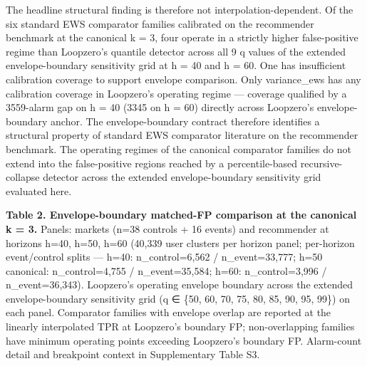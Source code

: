 \documentclass[
  11pt,
]{article}
\begin{document}
The headline structural finding is therefore not
interpolation-dependent. Of the six standard EWS comparator families
calibrated on the recommender benchmark at the canonical k = 3, four
operate in a strictly higher false-positive regime than Loopzero's
quantile detector across all 9 q values of the extended
envelope-boundary sensitivity grid at h = 40 and h = 60. One has
insufficient calibration coverage to support envelope comparison. Only
variance\_ews has any calibration coverage in Loopzero's operating
regime --- coverage qualified by a 3559-alarm gap on h = 40 (3345 on h =
60) directly across Loopzero's envelope-boundary anchor. The
envelope-boundary contract therefore identifies a structural property of
standard EWS comparator literature on the recommender benchmark. The
operating regimes of the canonical comparator families do not extend
into the false-positive regions reached by a percentile-based
recursive-collapse detector across the extended envelope-boundary
sensitivity grid evaluated here.

\textbf{Table 2. Envelope-boundary matched-FP comparison at the
canonical k = 3.} Panels: markets (n=38 controls + 16 events) and
recommender at horizons h=40, h=50, h=60 (40,339 user clusters per
horizon panel; per-horizon event/control splits --- h=40:
n\_control=6,562 / n\_event=33,777; h=50 canonical: n\_control=4,755 /
n\_event=35,584; h=60: n\_control=3,996 / n\_event=36,343). Loopzero's
operating envelope boundary across the extended envelope-boundary
sensitivity grid (q ∈ \{50, 60, 70, 75, 80, 85, 90, 95, 99\}) on each
panel. Comparator families with envelope overlap are reported at the
linearly interpolated TPR at Loopzero's boundary FP; non-overlapping
families have minimum operating points exceeding Loopzero's boundary FP.
Alarm-count detail and breakpoint context in Supplementary Table S3.
\end{document}
